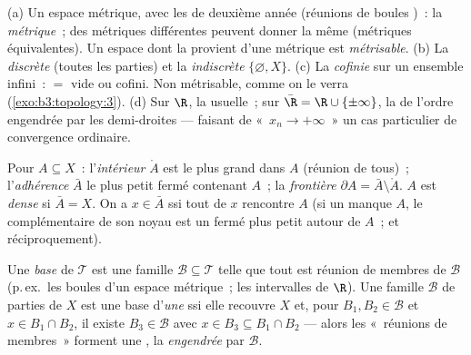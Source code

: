 \begin{example}\label{ex:b3:topology:examples}
(a) Un espace métrique, avec les  de deuxième année
(réunions de boules )~: la \emph{ métrique}~;
des métriques différentes peuvent donner la même 
(métriques équivalentes). Un espace dont la  provient
d'une métrique est \emph{métrisable}.
(b) La  \emph{discrète} (toutes les parties) et la
 \emph{indiscrète} $\{\varnothing, X\}$.
(c) La  \emph{cofinie} sur un ensemble infini~: 
$=$ vide ou cofini. Non métrisable, comme on le verra
(\cref{exo:b3:topology:3}).
(d) Sur $\R$, la  usuelle~; sur $\bar\R = \R \cup
\{\pm\infty\}$, la  de l'ordre engendrée par les
demi-droites --- faisant de «~$x_n \to +\infty$~» un cas
particulier de convergence ordinaire.
\end{example}

\begin{definition}\label{def:b3:topology:interior}
Pour $A \subseteq X$~: l'\emph{intérieur} $\mathring A$ est le
plus grand   dans $A$ (réunion de tous)~;
l'\emph{adhérence} $\bar A$ le plus petit
fermé contenant $A$~; la \emph{frontière} $\partial A = \bar A
\setminus \mathring A$. $A$ est \emph{dense}
si $\bar A = X$. On a $x \in \bar A$ ssi tout  de $x$
rencontre $A$ (si un  manque $A$, le complémentaire de
son noyau  est un fermé plus petit autour de $A$~; et
réciproquement).
\end{definition}

\begin{definition}\label{def:b3:topology:basis}
Une \emph{base} de $\mathcal T$ est
une famille $\mathcal B \subseteq \mathcal T$ telle que tout
 est réunion de membres de $\mathcal B$ (p.\,ex.\ les
boules  d'un espace métrique~; les intervalles 
de $\R$). Une famille $\mathcal B$ de parties de $X$ est une
base d'\emph{une}  ssi elle recouvre $X$ et, pour
$B_1, B_2 \in \mathcal B$ et $x \in B_1 \cap B_2$, il existe
$B_3 \in \mathcal B$ avec $x \in B_3 \subseteq B_1\cap B_2$
--- alors les «~réunions de membres~» forment une ,
la  \emph{engendrée} par $\mathcal B$.
\end{definition}

